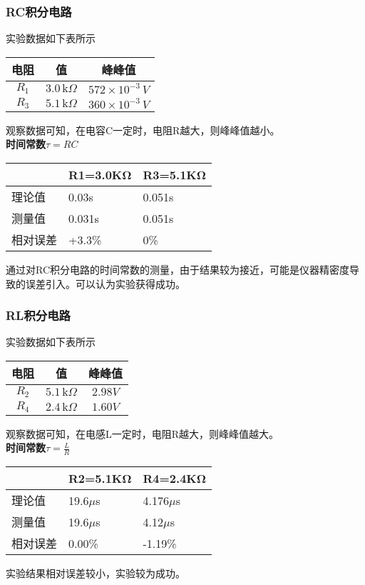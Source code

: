 \documentclass[dvipsnames, svgnames,a4paper,11pt]{article}
\begin{document}
	\subsubsection{RC积分电路}
	实验数据如下表所示
	\begin{table}[H]
		\centering
		
		\begin{tabular}{|c|c|c|}
		\hline
		电阻 & 值&峰峰值 \\
		\hline
		$R_1$ & $3.0\,\text{k}\Omega$&  $572 \times 10^{-3}\,V$\\
		\hline
		$R_3$ & $5.1\,\text{k}\Omega$ &$360 \times 10^{-3}\,V$\\
		
		\hline
		\end{tabular}
		\end{table}
		观察数据可知，在电容C一定时，电阻R越大，则峰峰值越小。\\
        \indent \textbf{时间常数$\tau=RC$}
		\begin{table}[H]
			\centering
			\begin{tabular}{|l|l|l|}
			\hline
				~ & R1=3.0KΩ & R3=5.1KΩ \\ \hline
				理论值 & 0.03s & 0.051s \\ \hline
				测量值 & 0.031s & 0.051s \\ \hline
				相对误差 & +3.3\% & 0\% \\ \hline
			\end{tabular}
		\end{table}
		通过对RC积分电路的时间常数的测量，由于结果较为接近，可能是仪器精密度导致的误差引入。可以认为实验获得成功。



		\subsubsection{RL积分电路}
	实验数据如下表所示
	\begin{table}[H]
		\centering
		
		\begin{tabular}{|c|c|c|}
		\hline
		电阻 & 值&峰峰值 \\
		\hline
		$R_2$ & $5.1\,\text{k}\Omega$&  $2.98V$\\
		\hline
		$R_4$ & $2.4\,\text{k}\Omega$ &$1.60V$\\
		
		\hline
		\end{tabular}
		\end{table}
		观察数据可知，在电感L一定时，电阻R越大，则峰峰值越大。\\
		\indent  \textbf{时间常数$\tau=\frac LR$}
	\begin{table}[H]
		\centering
		\begin{tabular}{|l|l|l|}
		\hline
			~ & R2=5.1KΩ & R4=2.4KΩ \\ \hline
			理论值 & 19.6$\mu$s & 4.176$\mu$s \\ \hline
			测量值 & 19.6$\mu$s & 4.12$\mu$s \\ \hline
			相对误差 & 0.00\% & -1.19\% \\ \hline
		\end{tabular}
	\end{table}
	实验结果相对误差较小，实验较为成功。
\end{document}
